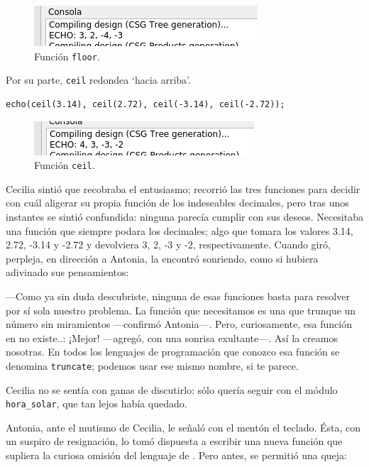 \begin{figure}[ht]
  \centering
\includegraphics[width=.75\textwidth]{imagenes/floor}  
  \caption{Función \lstinline!floor!.}
  \label{fig:floor}
\end{figure}

\guillemotright Por su parte, \lstinline!ceil! redondea `hacia arriba'.

\begin{lstlisting}[numbers=none]
echo(ceil(3.14), ceil(2.72), ceil(-3.14), ceil(-2.72));
\end{lstlisting}

\begin{figure}[ht]
  \centering
\includegraphics[width=.75\textwidth]{imagenes/ceil}  
  \caption{Función \lstinline!ceil!.}
  \label{fig:ceil}
\end{figure}

Cecilia sintió que recobraba el entusiasmo; recorrió las tres
funciones para decidir con cuál aligerar su propia función de los
indeseables decimales, pero tras unos instantes se sintió confundida:
ninguna parecía cumplir con sus deseos. Necesitaba una función que
siempre podara los decimales; algo que tomara los valores 3.14, 2.72,
-3.14 y -2.72 y devolviera 3, 2, -3 y -2, respectivamente. Cuando
giró, perpleja, en dirección a Antonia, la encontró sonriendo, como si
hubiera adivinado sus pensamientos:

---Como ya sin duda descubriste, ninguna de esas funciones basta para
resolver por sí sola nuestro problema. La función que necesitamos es
una que trunque un número sin miramientos ---con\-fir\-mó
Antonia---. Pero, curiosamente, esa función en \openscad{} no
existe..: ¡Mejor! ---agregó, con una sonrisa exultante---. Así la
creamos nosotras. En todos los lenguajes de programación que conozco
esa función se denomina \texttt{truncate}; podemos usar ese mismo
nombre, si te parece.

Cecilia no se sentía con ganas de discutirlo: sólo quería seguir con
el módulo \lstinline!hora_solar!, que tan lejos había quedado.

Antonia, ante el mutismo de Cecilia, le señaló con el mentón el
teclado. Ésta, con un suspiro de resignación, lo tomó dispuesta a
escribir una nueva función que supliera la curiosa omisión del
lenguaje de \openscad{}. Pero antes, se permitió una queja: 

